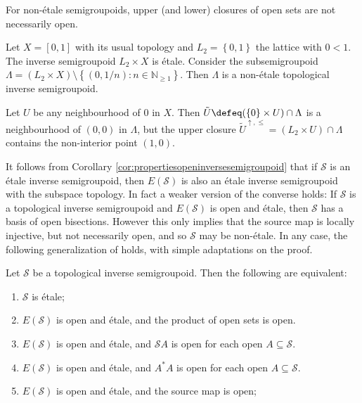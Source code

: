 \begin{example}
    For non-étale semigroupoids, upper (and lower) closures of open sets are not necessarily open.

    Let $X=[0,1]$ with its usual topology and $L_2=\left\{0,1\right\}$ the lattice with $0<1$. The inverse semigroupoid $L_2\times X$ is étale. Consider the subsemigroupoid $\Lambda=(L_2\times X)\setminus\left\{(0,1/n):n\in\mathbb{N}_{\geq 1}\right\}$. Then $\Lambda$ is a non-étale topological inverse semigroupoid.

    Let $U$ be any neighbourhood of $0$ in $X$. Then $\tilde{U}\defeq(\left\{0\right\}\times U)\cap\Lambda$ is a neighbourhood of $(0,0)$ in $\Lambda$, but the upper closure $\tilde{U}^{\uparrow,\leq}=(L_2\times U)\cap\Lambda$ contains the non-interior point $(1,0)$.
\end{example}

It follows from Corollary \ref{cor:propertiesopeninversesemigroupoid} that if $\mathcal{S}$ is an étale inverse semigroupoid, then $E(\mathcal{S})$ is also an étale inverse semigroupoid with the subspace topology. In fact a weaker version of the converse holds: If $\mathcal{S}$ is a topological inverse semigroupoid and $E(\mathcal{S})$ is open and étale, then $\mathcal{S}$ has a basis of open bisections. However this only implies that the source map is locally injective, but not necessarily open, and so $\mathcal{S}$ may be non-étale. In any case, the following generalization of \cite[Theorem 5.18]{MR2304314} holds, with simple adaptations on the proof.

\begin{theorem}
    Let $\mathcal{S}$ be a topological inverse semigroupoid. Then the following are equivalent:
    \begin{enumerate}[label=(\arabic*)]
        \item $\mathcal{S}$ is étale;
        \item $E(\mathcal{S})$ is open and étale, and the product of open sets is open.
        \item $E(\mathcal{S})$ is open and étale, and $\mathcal{S}A$ is open for each open $A\subseteq\mathcal{S}$.
        \item $E(\mathcal{S})$ is open and étale, and $A^*A$ is open for each open $A\subseteq\mathcal{S}$.
        \item $E(\mathcal{S})$ is open and étale, and the source map is open;
    \end{enumerate}
\end{theorem}

